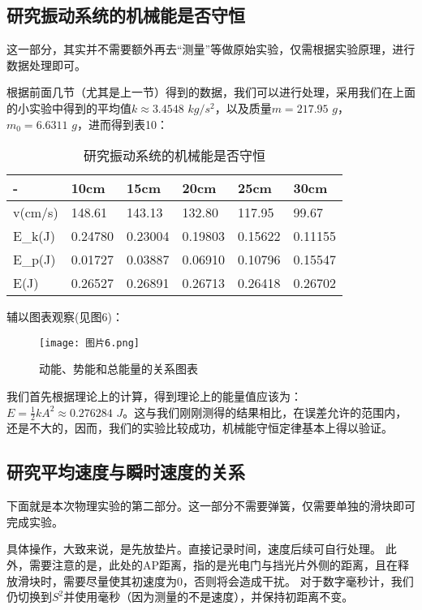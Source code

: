 \documentclass[11pt]{article}
\begin{document}
\subsection{研究振动系统的机械能是否守恒}

这一部分，其实并不需要额外再去“测量”等做原始实验，仅需根据实验原理，进行数据处理即可。

根据前面几节（尤其是上一节）得到的数据，我们可以进行处理，采用我们在上面的小实验中得到的平均值$k\approx 3.4548 \,\, kg/s^2$，以及质量$m=217.95 \,\,g$，$m_0=6.6311\,\, g$，进而得到表10：

\begin{table}[!ht]
    \centering
    \begin{tabular}{|l|l|l|l|l|l|}
    \hline
        - & 10cm & 15cm & 20cm & 25cm & 30cm \\ \hline
        v(cm/s) & 148.61 & 143.13 & 132.80 & 117.95 & 99.67 \\ \hline
        E\_k(J) & 0.24780 & 0.23004 & 0.19803 & 0.15622 & 0.11155\\ \hline
        E\_p(J) & 0.01727 & 0.03887 & 0.06910 & 0.10796 & 0.15547 \\ \hline
        E(J) & 0.26527 & 0.26891 & 0.26713 & 0.26418 & 0.26702 \\ \hline
    \end{tabular}
    \caption{研究振动系统的机械能是否守恒}
\end{table}
辅以图表观察(见图6)：
\begin{figure}[htbp]
        \centering
        \texttt{[image: 图片6.png]}
        \caption{动能、势能和总能量的关系图表}
    \end{figure}
我们首先根据理论上的计算，得到理论上的能量值应该为：$\displaystyle E=\frac{1}{2} kA^2\approx 0.276284\,\, J$。这与我们刚刚测得的结果相比，在误差允许的范围内，还是不大的，因而，我们的实验比较成功，机械能守恒定律基本上得以验证。

\newpage
\subsection{研究平均速度与瞬时速度的关系}

下面就是本次物理实验的第二部分。这一部分不需要弹簧，仅需要单独的滑块即可完成实验。

具体操作，大致来说，是先放垫片。直接记录时间，速度后续可自行处理。
此外，需要注意的是，此处的AP距离，指的是光电门与挡光片外侧的距离，且在释放滑块时，需要尽量使其初速度为0，否则将会造成干扰。
对于数字毫秒计，我们仍切换到$S^2$并使用毫秒（因为测量的不是速度），并保持初距离不变。
\end{document}
